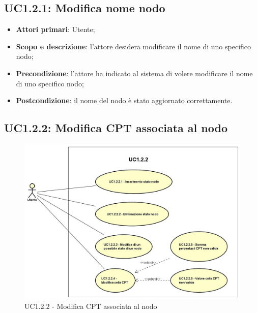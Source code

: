 \subsection{UC1.2.1: Modifica nome nodo} 
\hypertarget{UC1.2.1}{} 
\begin{itemize} 
	\item{\textbf{Attori primari}: Utente;} 
	\item{\textbf{Scopo e descrizione}: l'attore desidera modificare il nome di uno specifico nodo;} 
	\item{\textbf{Precondizione}: l'attore ha indicato al sistema di volere modificare il nome di uno specifico nodo;} 
	\item{\textbf{Postcondizione}: il nome del nodo è stato aggiornato correttamente.} 
\end{itemize} 
\subsection{UC1.2.2: Modifica CPT associata al nodo} 
\hypertarget{UC1.2.2}{} 
\begin{figure} [H]
	\centering
	\includegraphics[scale=0.45]{Img/UC1-2-2} 
	\caption{UC1.2.2 - Modifica CPT associata al nodo} \label{} 
\end{figure} 
